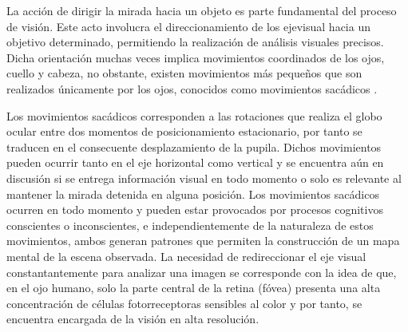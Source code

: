 \documentclass[../main.tex]{subfiles}
\begin{document}
		La acción de dirigir la mirada hacia un objeto es parte fundamental del proceso de visión. Este acto involucra el direccionamiento de los \gls{ejevisual} hacia un objetivo determinado, permitiendo la realización de análisis visuales precisos. Dicha orientación muchas veces implica movimientos coordinados de los ojos, cuello y cabeza, no obstante, existen movimientos más pequeños que son realizados únicamente por los ojos, conocidos como movimientos sacádicos \cite{article:movOcular1, article:movOcular2}.

		Los movimientos sacádicos corresponden a las rotaciones que realiza el globo ocular entre dos momentos de posicionamiento estacionario, por tanto se traducen en el consecuente desplazamiento de la pupila. Dichos movimientos pueden ocurrir tanto en el eje horizontal como vertical y se encuentra aún en discusión si se entrega información visual en todo momento o solo es relevante al mantener la mirada detenida en alguna posición. Los movimientos sacádicos ocurren en todo momento y pueden estar provocados por procesos cognitivos conscientes o inconscientes, e independientemente de la naturaleza de estos movimientos, ambos generan patrones que permiten la construcción de un mapa mental de la escena observada. La necesidad de redireccionar el eje visual constantantemente para analizar una imagen se corresponde con la idea de que, en el ojo humano, solo la parte central de la retina (fóvea) presenta una alta concentración de células fotorreceptoras sensibles al color y por tanto, se encuentra encargada de la visión en alta resolución. 
\end{document}
